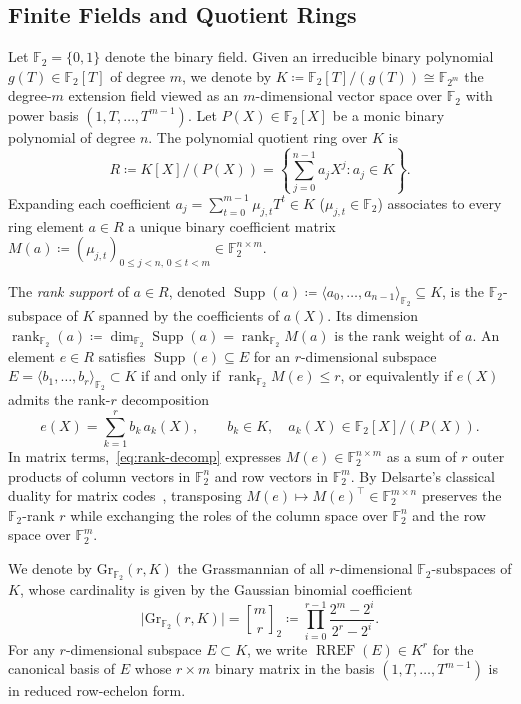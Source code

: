 \documentclass[11pt,a4paper]{article}
\theoremstyle{definition}
\theoremstyle{remark}
\newcommand{\F}{\mathbb{F}}
\newcommand{\Ftwo}{\mathbb{F}_2}
\newcommand{\Gr}{\mathrm{Gr}}
\newcommand{\Supp}{\operatorname{Supp}}
\newcommand{\rk}{\operatorname{rank}}
\newcommand{\RREF}{\operatorname{RREF}}
\begin{document}
\subsection{Finite Fields and Quotient Rings}
Let $\Ftwo = \{0, 1\}$ denote the binary field. Given an irreducible binary polynomial $g(T) \in \Ftwo[T]$ of degree $m$, we denote by $K \coloneqq \Ftwo[T]/(g(T)) \cong \F_{2^m}$ the degree-$m$ extension field viewed as an $m$-dimensional vector space over $\Ftwo$ with power basis $(1, T, \dots, T^{m-1})$. Let $P(X) \in \Ftwo[X]$ be a monic binary polynomial of degree $n$. The polynomial quotient ring over $K$ is
\[
    R \coloneqq K[X] / (P(X)) = \left\{ \sum_{j=0}^{n-1} a_j X^j : a_j \in K \right\}.
\]
Expanding each coefficient $a_j = \sum_{t=0}^{m-1} \mu_{j,t} T^t \in K$ ($\mu_{j,t} \in \Ftwo$) associates to every ring element $a \in R$ a unique binary coefficient matrix $M(a) \coloneqq (\mu_{j,t})_{0 \le j < n,\, 0 \le t < m} \in \Ftwo^{n \times m}$.

The \emph{rank support} of $a \in R$, denoted $\Supp(a) \coloneqq \langle a_0, \dots, a_{n-1} \rangle_{\Ftwo} \subseteq K$, is the $\Ftwo$-subspace of $K$ spanned by the coefficients of $a(X)$. Its dimension $\rk_{\Ftwo}(a) \coloneqq \dim_{\Ftwo}\Supp(a) = \rk_{\Ftwo} M(a)$ is the rank weight of $a$. An element $e \in R$ satisfies $\Supp(e) \subseteq E$ for an $r$-dimensional subspace $E = \langle b_1, \dots, b_r \rangle_{\Ftwo} \subset K$ if and only if $\rk_{\Ftwo} M(e) \le r$, or equivalently if $e(X)$ admits the rank-$r$ decomposition
\begin{equation}
\label{eq:rank-decomp}
    e(X) = \sum_{k=1}^{r} b_k \, a_k(X), \qquad b_k \in K,\quad a_k(X) \in \Ftwo[X]/(P(X)).
\end{equation}
In matrix terms,~\eqref{eq:rank-decomp} expresses $M(e) \in \Ftwo^{n \times m}$ as a sum of $r$ outer products of column vectors in $\Ftwo^n$ and row vectors in $\Ftwo^m$. By Delsarte's classical duality for matrix codes~\cite{Delsarte78}, transposing $M(e) \mapsto M(e)^\top \in \Ftwo^{m \times n}$ preserves the $\Ftwo$-rank $r$ while exchanging the roles of the column space over $\Ftwo^n$ and the row space over $\Ftwo^m$.

We denote by $\Gr_{\Ftwo}(r, K)$ the Grassmannian of all $r$-dimensional $\Ftwo$-subspaces of $K$, whose cardinality is given by the Gaussian binomial coefficient
\[
    \bigl|\Gr_{\Ftwo}(r, K)\bigr| = \genfrac{[}{]}{0pt}{}{m}{r}_2 \coloneqq \prod_{i=0}^{r-1} \frac{2^m - 2^i}{2^r - 2^i}.
\]
For any $r$-dimensional subspace $E \subset K$, we write $\RREF(E) \in K^r$ for the canonical basis of $E$ whose $r \times m$ binary matrix in the basis $(1, T, \dots, T^{m-1})$ is in reduced row-echelon form.
\end{document}
